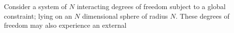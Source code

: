Consider a system of $N$ interacting degrees of freedom subject to a global constraint; lying on an $N$ dimensional sphere of radius $N$. These degrees of freedom may also experience an external 